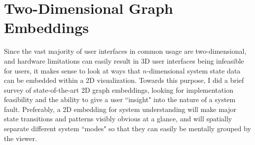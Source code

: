 












\section{Two-Dimensional Graph Embeddings}

Since the vast majority of user interfaces in common usage are two-dimensional, and hardware limitations can easily result in 3D user interfaces being infeasible for users, it makes sense to look at ways that $n$-dimensional system state data can be embedded within a 2D visualization. Towards this purpose, I did a brief survey of state-of-the-art 2D graph embeddings, looking for implementation feasibility and the ability to give a user ``insight" into the nature of a system fault. Preferably, a 2D embedding for system understanding will make major state transitions and patterns visibly obvious at a glance, and will spatially separate different system ``modes" so that they can easily be mentally grouped by the viewer.

